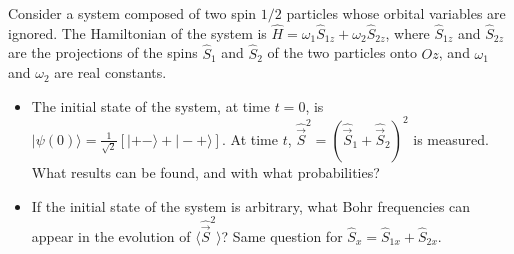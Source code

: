 \documentclass[10pt,a4paper]{article}
\newenvironment{problem}[2][Problem]{\begin{trivlist}
\item[\hskip \labelsep {\bfseries #1}\hskip \labelsep {\bfseries #2.}]}{\end{trivlist}}
\begin{document}
\begin{problem}{4}
[C-T Exercise 10-3] Consider a system composed of two spin $1/2$ particles whose orbital variables are ignored. The Hamiltonian of the system is $\hat{H}=\omega_1\hat{S}_{1z}+\omega_2\hat{S}_{2z}$, where $\hat{S}_{1z}$ and $\hat{S}_{2z}$ are the projections of the spins $\hat{S}_1$ and $\hat{S}_2$ of the two particles onto $Oz$, and $\omega_1$ and $\omega_2$ are real constants.
\begin{itemize}
\item[(a)] The initial state of the system, at time $t=0$, is $|\psi(0)\rangle=\frac{1}{\sqrt{2}}[|+-\rangle+|-+\rangle]$. At time $t$, $\hat{\vec{S}}^2=(\hat{\vec{S}}_1+\hat{\vec{S}}_2)^2$ is measured. What results can be found, and with what probabilities?
\item[(b)] If the initial state of the system is arbitrary, what Bohr frequencies can appear in the evolution of $\langle\hat{\vec{S}}^2\rangle$? Same question for $\hat{S}_x=\hat{S}_{1x}+\hat{S}_{2x}$.
\end{itemize}
\end{problem}
\end{document}
